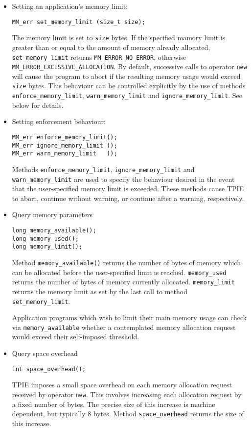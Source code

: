 \begin{itemize}
\item Setting an application's memory limit:
\begin{verbatim}
MM_err set_memory_limit (size_t size);
\end{verbatim}

The memory limit is set to \verb|size| bytes. If the
specified mamory limit is greater than or equal to the
amount of memory already allocated, \verb|set_memory_limit|
returns \verb|MM_ERROR_NO_ERROR|, otherwise
\verb|MM_ERROR_EXCESSIVE_ALLOCATION|. By default, successive
calls to operator \verb|new| will cause the program to abort
if the resulting memory usage would exceed \verb|size|
bytes. This behaviour can be controlled explicitly by the
use of methods \verb|enforce_memory_limit|,
\verb|warn_memory_limit| and \verb|ignore_memory_limit|.
See below for details.

\item Setting enforcement behaviour:
\begin{verbatim}
MM_err enforce_memory_limit();
MM_err ignore_memory_limit ();
MM_err warn_memory_limit   ();
\end{verbatim}

Methods \verb|enforce_memory_limit|,
\verb|ignore_memory_limit| and \verb|warn_memory_limit| are
used to specify the behaviour desired in the event that the
user-specified memory limit is exceeded. These methods cause
TPIE to abort, continue without warning, or continue after a
warning, respectively.

\item Query memory parameters

\begin{verbatim}
long memory_available();
long memory_used();
long memory_limit();
\end{verbatim}

Method \verb|memory_available()| returns the number of bytes
of memory which can be allocated before the user-specified
limit is reached. \verb|memory_used| returns the number of
bytes of memory currently allocated. \verb|memory_limit|
returns the memory limit as set by the last call to method
\verb|set_memory_limit|.

Application programs which wish to limit their main memory
usage can check via \verb|memory_available| whether a
contemplated memory allocation request would exceed their
self-imposed threshold.

\item Query space overhead

\begin{verbatim}
int space_overhead();
\end{verbatim}

TPIE imposes a small space overhead on each memory
allocation request received by operator \verb|new|. This involves
increasing each allocation request by a fixed number of
bytes. The precise size of this increase is machine
dependent, but typically 8 bytes. Method \verb|space_overhead|
returns the size of this increase.
\end{itemize}

